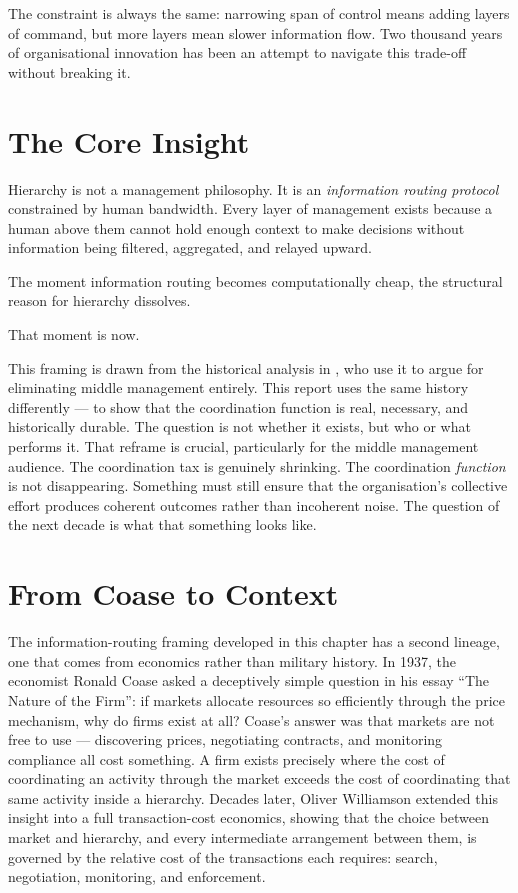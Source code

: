 The constraint is always the same: narrowing span of control means adding layers of command, but more layers mean slower information flow. Two thousand years of organisational innovation has been an attempt to navigate this trade-off without breaking it.

\section{The Core Insight}

\begin{keyinsight}[title={The Structural Argument}]
Hierarchy is not a management philosophy. It is an \emph{information routing protocol} constrained by human bandwidth. Every layer of management exists because a human above them cannot hold enough context to make decisions without information being filtered, aggregated, and relayed upward.

The moment information routing becomes computationally cheap, the structural reason for hierarchy dissolves.

That moment is now.
\end{keyinsight}

This framing is drawn from the historical analysis in \textcite{DorseyBotha2026}, who use it to argue for eliminating middle management entirely. This report uses the same history differently --- to show that the coordination function is real, necessary, and historically durable. The question is not whether it exists, but who or what performs it. That reframe is crucial, particularly for the middle management audience. The coordination tax is genuinely shrinking. The coordination \emph{function} is not disappearing. Something must still ensure that the organisation's collective effort produces coherent outcomes rather than incoherent noise. The question of the next decade is what that something looks like.

\section{From Coase to Context}

The information-routing framing developed in this chapter has a second lineage, one that comes from economics rather than military history. In 1937, the economist Ronald Coase asked a deceptively simple question in his essay ``The Nature of the Firm'': if markets allocate resources so efficiently through the price mechanism, why do firms exist at all? Coase's answer was that markets are not free to use --- discovering prices, negotiating contracts, and monitoring compliance all cost something. A firm exists precisely where the cost of coordinating an activity through the market exceeds the cost of coordinating that same activity inside a hierarchy. Decades later, Oliver Williamson extended this insight into a full transaction-cost economics, showing that the choice between market and hierarchy, and every intermediate arrangement between them, is governed by the relative cost of the transactions each requires: search, negotiation, monitoring, and enforcement.


